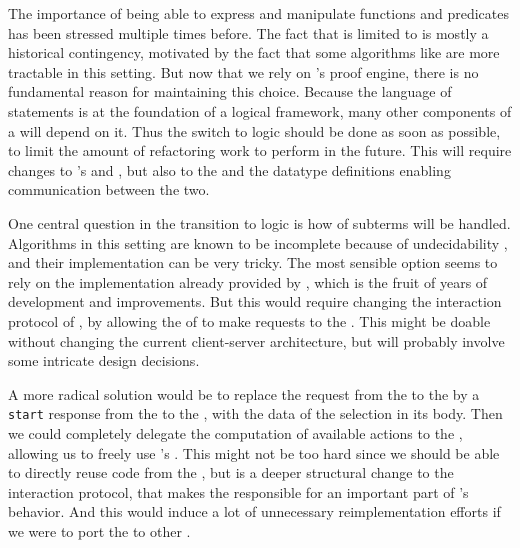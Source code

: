 The importance of being able to express and manipulate 
functions and predicates has been stressed multiple times before. The fact that
 is limited to  is mostly a historical
contingency, motivated by the fact that some algorithms like 
are more tractable in this setting. But now that we rely on 's proof
engine, there is no fundamental reason for maintaining this choice. Because the
language of statements is at the foundation of a logical framework, many other
components of a  will depend on it. Thus the switch to
 logic should be done as soon as possible, to limit the amount
of refactoring work to perform in the future. This will require changes to
's  and , but also to the 
 and the 
datatype definitions enabling communication between the two.

One central question in the transition to  logic is how
 of subterms will be handled. Algorithms in this setting are
known to be incomplete because of undecidability
, and their implementation can be very
tricky. The most sensible option seems to rely on the implementation already
provided by , which is the fruit of years of development and
improvements. But this would require changing the interaction protocol of
, by allowing the  of  to make
 requests to the . This might be doable without
changing the current client-server architecture, but will probably involve some
intricate design decisions.

A more radical solution would be to replace the  request from
the  to the  by a \texttt{start} response
from the  to the , with the data of the
selection in its body. Then we could completely delegate the computation of
available actions to the , allowing us to freely use 's
. This might not be too hard since we should be able to directly
reuse  code from the , but is a deeper structural change
to the interaction protocol, that makes the  responsible for an
important part of 's behavior. And this would induce a lot of
unnecessary reimplementation efforts if we were to port the  to
other .


